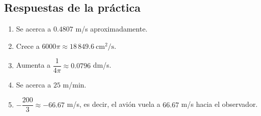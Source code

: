 \documentclass[12pt]{article}
\begin{document}
\subsection{Respuestas de la práctica}
\begin{enumerate}
    \item Se acerca a $0.4807$ m/s aproximadamente.
    \item Crece a $6000\pi \approx 18\,849.6\ \text{cm}^2/\text{s}$.
    \item Aumenta a $\dfrac{1}{4\pi} \approx 0.0796$ dm/s.
    \item Se acerca a $25$ m/min.
    \item $-\dfrac{200}{3} \approx -66.67$ m/s, es decir, el avión vuela a $66.67$ m/s hacia el observador.
\end{enumerate}
\end{document}
